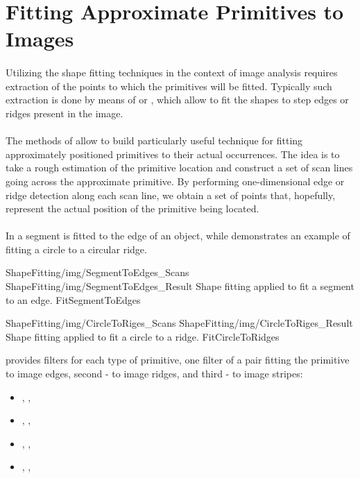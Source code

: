 \section{Fitting Approximate Primitives to Images}

\paragraph*{}
Utilizing the shape fitting techniques in the context of image analysis requires extraction of the points to which the primitives will be fitted. Typically such extraction is done by means of  or , which allow to fit the shapes to step edges or ridges present in the image.

\paragraph*{}
The methods of  allow to build particularly useful technique for fitting approximately positioned primitives to their actual occurrences. The idea is to take a rough estimation of the primitive location and construct a set of scan lines going across the approximate primitive. By performing one-dimensional edge or ridge detection along each scan line, we obtain a set of points that, hopefully, represent the actual position of the primitive being located.

\paragraph*{}
In  a segment is fitted to the edge of an object, while  demonstrates an example of fitting a circle to a circular ridge.

\twoFigures
{ShapeFitting/img/SegmentToEdges_Scans}
{ShapeFitting/img/SegmentToEdges_Result}
{Shape fitting applied to fit a segment to an edge.}
{FitSegmentToEdges}
{\basicWidth}

\twoFigures
{ShapeFitting/img/CircleToRiges_Scans}
{ShapeFitting/img/CircleToRiges_Result}
{Shape fitting applied to fit a circle to a ridge.}
{FitCircleToRidges}
{\basicWidth}

\begin{refImpl}
\studio provides filters for each type of primitive, one filter of a pair fitting the primitive to image edges, second - to image ridges, and third - to image stripes:
\begin{itemize}
	\item {}, , 
	\item {}, , 
	\item {}, , 
	\item {}, , 
\end{itemize}
\end{refImpl}